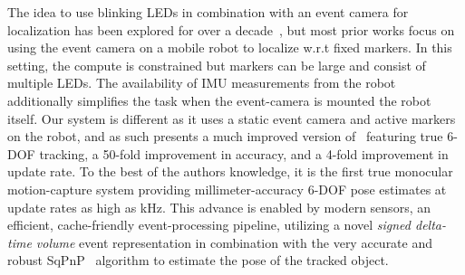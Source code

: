 The idea to use blinking LEDs in combination with an event camera for localization has been explored for over a decade~\cite{censi2013activeled, ebmer2024realtime6dof, loch2023eventbasedfiducial, salah2022neuromorphicvisionbased}, but most prior works focus on using the event camera on a mobile robot to localize w.r.t fixed markers. In this setting, the compute is constrained but markers can be large and consist of multiple LEDs. The availability of IMU measurements from the robot additionally simplifies the task when the event-camera is mounted the robot itself. Our system is different as it uses a static event camera and active markers on the robot, and as such presents a much improved version of~\cite{censi2013activeled} featuring true 6-DOF tracking, a 50-fold improvement in accuracy, and a 4-fold improvement in update rate. To the best of the authors knowledge, it is the first true monocular motion-capture system providing millimeter-accuracy 6-DOF pose estimates at update rates as high as \unit[1]{kHz}. This advance is enabled by modern sensors, an efficient, cache-friendly event-processing pipeline, utilizing a novel \emph{signed delta-time volume} event representation in combination with the very accurate and robust SqPnP~\cite{terzakis2020sqpnp} algorithm to estimate the pose of the tracked object.